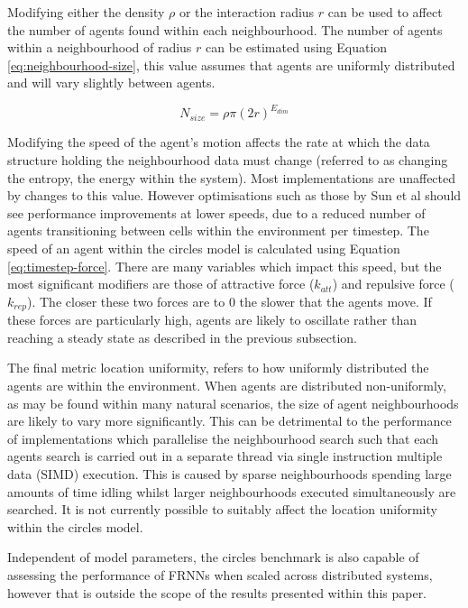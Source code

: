     Modifying either the density $\rho$ or the interaction radius $r$ can be used to affect the number of agents found within each neighbourhood. The number of agents within a neighbourhood of radius $r$ can be estimated using Equation \ref{eq:neighbourhood-size}, this value assumes that agents are uniformly distributed and will vary slightly between agents.
    
    \begin{equation}\label{eq:neighbourhood-size}
        N_{size} = \rho \pi (2r)^{E_{dim}}
    \end{equation}
      
    Modifying the speed of the agent's motion affects the rate at which the data structure holding the neighbourhood data must change (referred to as changing the entropy, the energy within the system). Most implementations are unaffected by changes to this value. However optimisations such as those by Sun et al \cite{HY*15} should see performance improvements at lower speeds, due to a reduced number of agents transitioning between cells within the environment per timestep. The speed of an agent within the circles model is calculated using Equation \ref{eq:timestep-force}. There are many variables which impact this speed, but the most significant modifiers are those of attractive force ($k_{att}$) and repulsive force ($k_{rep}$). The closer these two forces are to $0$ the slower that the agents move. If these forces are particularly high, agents are likely to oscillate rather than reaching a steady state as described in the previous subsection.
    
    The final metric location uniformity, refers to how uniformly distributed the agents are within the environment. When agents are distributed non-uniformly, as may be found within many natural scenarios, the size of agent neighbourhoods are likely to vary more significantly. This can be detrimental to the performance of implementations which parallelise the neighbourhood search such that each agents search is carried out in a separate thread via single instruction multiple data (SIMD) execution. This is caused by sparse neighbourhoods spending large amounts of time idling whilst larger neighbourhoods executed simultaneously are searched. It is not currently possible to suitably affect the location uniformity within the circles model.
    
    Independent of model parameters, the circles benchmark is also capable of assessing the performance of FRNNs when scaled across distributed systems, however that is outside the scope of the results presented within this paper.